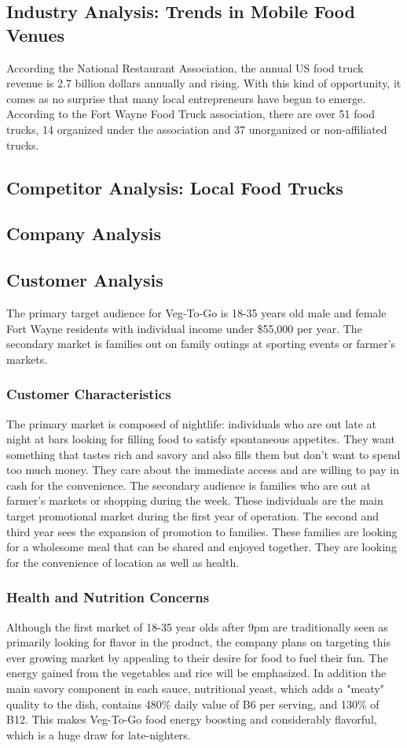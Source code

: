 \documentclass[12pt, letterpaper]{article}
\newcommand{\companyname}{Veg-To-Go}
\begin{document}
\subsection{Industry Analysis: Trends in Mobile Food Venues}
According the National Restaurant Association, the annual US food truck revenue is 2.7 billion dollars annually and rising. \cite{ibis1} With this kind of opportunity, it comes as no surprise
that many local entrepreneurs have begun to emerge. According to the Fort Wayne Food Truck association, there are over 51 food trucks, 14 organized under the association and 37 unorganized or non-affiliated trucks. \cite{fwfta}
\subsection{Competitor Analysis: Local Food Trucks}

\subsection{Company Analysis}
\subsection{Customer Analysis}
The primary target audience for Veg-To-Go is 18-35 years old male and female Fort Wayne residents with individual income under \$55,000 per year.  The secondary market is families out on family outings at sporting events or farmer's markets.
\subsubsection{Customer Characteristics}
The primary market is composed of nightlife: individuals who are out late at night at bars looking for filling food to satisfy spontaneous appetites. They want something that tastes rich and savory and also fills them but don't want to spend too much money. They care about the immediate access and are willing to pay in cash for the convenience. The secondary audience is families who are out at farmer's markets or shopping during the week.  These individuals are the main target promotional market during the first year of operation.
The second and third year sees the expansion of promotion to families.  These families are looking for a wholesome meal that can be shared and enjoyed together. They are looking for the convenience of location as well as health. 
\subsubsection{Health and Nutrition Concerns}
Although the first market of 18-35 year olds after 9pm are traditionally seen as primarily looking for flavor in the product, the company plans on targeting this ever growing market by appealing to their desire for food to fuel their fun.  The energy gained from the vegetables and rice will be emphasized.  In addition the main savory component in each sauce, nutritional yeast, which adds a "meaty" quality to the dish, contains 480\% daily value of B6 per serving, and 130\% of B12. \cite{yeast} This makes \companyname{} food energy boosting and considerably flavorful, which is a huge draw for late-nighters.
\end{document}
